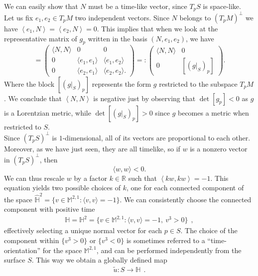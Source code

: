 \documentclass[a4paper,11pt,openright,twoside]{book}
\newcommand{\R}{\mathbb{R}}
\newcommand{\M}{\mathbb{M}^{2,1}}
\newcommand{\1}{\mathds{1}}
\theoremstyle{plain}
\theoremstyle{definition}
\theoremstyle{remark}
\begin{document}
We can easily show that  $N$ must be a time-like vector, since $T_p S$ is space-like.\\
Let us fix $e_1, e_2 \in T_pM$ two independent vectors. Since $N$ belongs to $(T_pM)^\perp$ we have $\left<e_1,N \right> = \left<e_2,N \right> = 0$. This implies that when we look at the representative matrix of $g_p$ written in the basis $(N,e_1,e_2)$, we have
\begin{equation*}
	[g_p] = 
\begin{pmatrix}
\langle N,N\rangle & 0 & 0\\
0 & \langle e_1,e_1\rangle & \langle e_1,e_2\rangle\\
0 & \langle e_2,e_1\rangle & \langle e_2,e_2\rangle.
\end{pmatrix} =:
\begin{pmatrix}
\langle N, N\rangle & 0 \\
0 & [(g|_S)_p]
\end{pmatrix}.
\end{equation*}
Where the block $[(g|_S)_p]$ represents the form $g$ restricted to the subspace $T_pM$. We conclude that $\left<N,N \right>$ is negative just by observing that $\det [g_p] <0$ as $g$ is a Lorentzian metric, while $\det[(g|_S)_p]>0 $ since  $g$  becomes a metric when restricted to $S$.\\

Since $(T_pS)^\perp$ is $1$-dimensional, all of its vectors are proportional to each other. Moreover, as we have just seen, they are all timelike, so if $w$ is a nonzero vector in $(T_pS)^\perp$, then \[ \langle w,w\rangle<0.\] 
We can thus rescale $w$ by a factor $k\in \R$ such that $\left<kw,kw \right> = -1$. This equation yields two possible choices of $k$, one for each connected component of the space $\hat{\mathbb H}^2=\{v\in \M:\langle v,v\rangle=-1\}$. We can consistently choose the connected component with positive time 
\begin{align*}
	\mathbb H=\mathbb H^2=\{v\in \M:\langle v,v\rangle=-1,\ v^3>0\}
\ \ ,
\end{align*}
effectively selecting a unique normal vector for each $p\in S$. The choice of the component within  $\{v^3>0\} $ or $\{v^3<0\} $ is sometimes referred to a ``time-orientation'' for the space $\M$, and can be performed independently from the surface $S$. 
This way we obtain a globally defined map
\begin{align}\label{eq:gausshmap}
	\tilde  u:S\to \mathbb{H}
\ \ .
\end{align}
\end{document}
